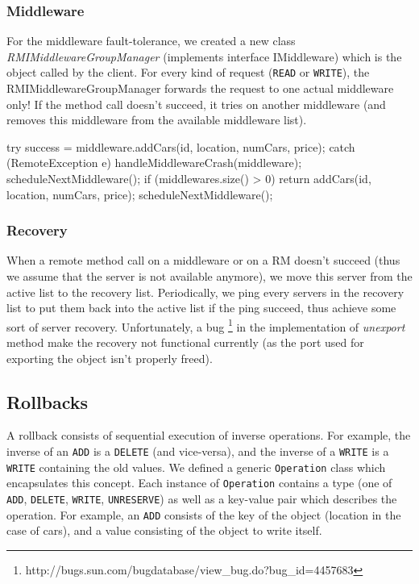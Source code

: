 \documentclass[a4paper]{article}
\begin{document}
\subsubsection{Middleware}
For the middleware fault-tolerance, we created a new class \emph{RMIMiddlewareGroupManager} (implements interface IMiddleware) which is the object called by the client. 
For every kind of request (\texttt{READ} or \texttt{WRITE}), the RMIMiddlewareGroupManager forwards the request to one actual middleware only! If the method call doesn't succeed, it tries on another middleware (and removes this middleware from the available middleware list).
\begin{javacode}
    try {
      success = middleware.addCars(id, location, numCars, price);
    } catch (RemoteException e){
      handleMiddlewareCrash(middleware);
      scheduleNextMiddleware();
      if (middlewares.size() > 0)
        return addCars(id, location, numCars, price);
    }	
    scheduleNextMiddleware();
\end{javacode}

\subsubsection{Recovery}

When a remote method call on a middleware or on a RM doesn't succeed (thus we assume that the server is not available anymore), we move this server from the active list to the recovery list.
Periodically, we ping every servers in the recovery list to put them back into the active list if the ping succeed, thus achieve some sort of server recovery.
Unfortunately, a bug
\footnote{http://bugs.sun.com/bugdatabase/view\_bug.do?bug\_id=4457683} in the implementation of \emph{unexport} method make the recovery not functional currently (as the port used for exporting the object isn't properly freed).
\subsection{Rollbacks}
\label{rollbacks}

A rollback consists of sequential execution of inverse operations. For example, the inverse of an \texttt{ADD} is a \texttt{DELETE} (and vice-versa), and the inverse of a \texttt{WRITE} is a \texttt{WRITE} containing the old values. 
We defined a generic \texttt{Operation} class which encapsulates this concept. Each instance of \texttt{Operation} contains a type (one of \texttt{ADD}, \texttt{DELETE}, \texttt{WRITE}, \texttt{UNRESERVE}) as well as a key-value pair
which describes the operation. For example, an \texttt{ADD} consists of the key of the object (location in the case of cars), and a value consisting of the object to write itself. 
\end{document}
